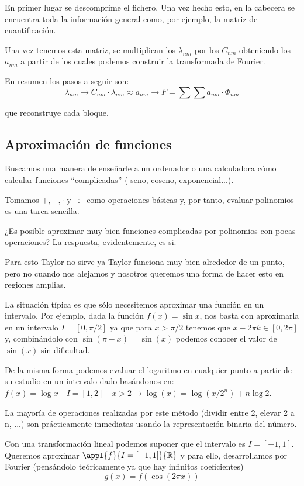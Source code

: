 			En primer lugar se descomprime el fichero. Una vez hecho esto, en la cabecera se encuentra toda la información general como, por ejemplo,  la matriz de cuantificación.

			Una vez tenemos esta matriz, se multiplican los $\lambda_{nm}$ por los $C_{nm}$ obteniendo los $a_{nm}$ a partir de los cuales podemos construir la transformada de Fourier.

			En resumen los pasos a seguir son:
			$$\lambda_{nm} \rightarrow C_{nm}\cdot \lambda_{nm} \approx a_{nm} \rightarrow F = \sum \sum a_{nm} \cdot \Phi_{nm}$$

			que reconstruye cada bloque.

	\subsection{Aproximación de funciones}

		Buscamos una manera de enseñarle a un ordenador o una calculadora cómo calcular funciones ``complicadas'' ( seno, coseno, exponencial...).


		Tomamos $ +,-, \cdot \text{ y } \div$ como operaciones básicas y, por tanto, evaluar polinomios es una tarea sencilla.

		¿Es posible aproximar muy bien funciones complicadas por polinomios con pocas operaciones? La respuesta, evidentemente, es si.


		Para esto Taylor no sirve ya Taylor funciona muy bien alrededor de un punto, pero no cuando nos alejamos y nosotros queremos una forma de hacer esto en regiones amplias.


		La situación típica es que sólo necesitemos aproximar una función en un intervalo. Por ejemplo, dada la función $f(x) = \sin x $, nos basta con aproximarla en un intervalo $I= [0, \pi/2]$ ya que para $x > \pi/2$ tenemos que $x - 2\pi k \in [0, 2\pi]$ y, combinándolo con $\sin (\pi - x) = \sin (x)$ podemos conocer el valor de $\sin(x)$ sin dificultad.

		De la misma forma podemos evaluar el logaritmo en cualquier punto a partir de su estudio en un intervalo dado basándonos en:
		$f(x) = \log x \quad I= [1, 2] \quad x > 2 \rightarrow \log (x) = \log(x / 2^n) + n \log 2$.

		La mayoría de operaciones realizadas por este método (dividir entre 2, elevar 2 a n, ...) son prácticamente inmediatas usando la representación binaria del número.


		Con una transformación lineal podemos suponer que el intervalo es $I = [-1,1]$. Queremos aproximar $\appl{f}{I = [-1,1]}{\mathbb{R}}$ y para ello, desarrollamos por Fourier (pensándolo teóricamente ya que hay infinitos coeficientes)
		\[g(x) = f(\cos(2 \pi x))\]

